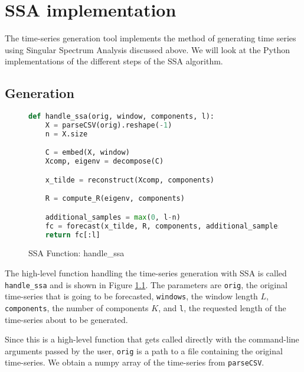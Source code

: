 
\chapter{SSA implementation}\label{chapter:ssa-impl}

The time-series generation tool implements the method of generating time series using Singular Spectrum Analysis discussed above. We will look at the Python implementations of the different steps of the SSA algorithm. \parencite{tsgenerator}

\section{Generation}

\begin{figure}
\begin{singlespace}
\begin{lstlisting}[language=Python]
def handle_ssa(orig, window, components, l):
    X = parseCSV(orig).reshape(-1)
    n = X.size

    C = embed(X, window)
    Xcomp, eigenv = decompose(C)

    x_tilde = reconstruct(Xcomp, components)

    R = compute_R(eigenv, components)

    additional_samples = max(0, l-n)
    fc = forecast(x_tilde, R, components, additional_samples)
    return fc[:l]
\end{lstlisting}
\end{singlespace}
\caption{SSA Function: handle\_ssa}    
\label{fig:ssa-handle}
\end{figure}

The high-level function handling the time-series generation with SSA is called \texttt{handle\_ssa} and is shown in Figure \ref{fig:ssa-handle}. The parameters are \texttt{orig}, the original time-series that is going to be forecasted, \texttt{windows}, the window length $L$, \texttt{components}, the number of components $K$, and \texttt{l}, the requested length of the time-series about to be generated. 

Since this is a high-level function that gets called directly with the command-line arguments passed by the user, \texttt{orig} is a path to a file containing the original time-series. We obtain a numpy array of the time-series from \texttt{parseCSV}.

